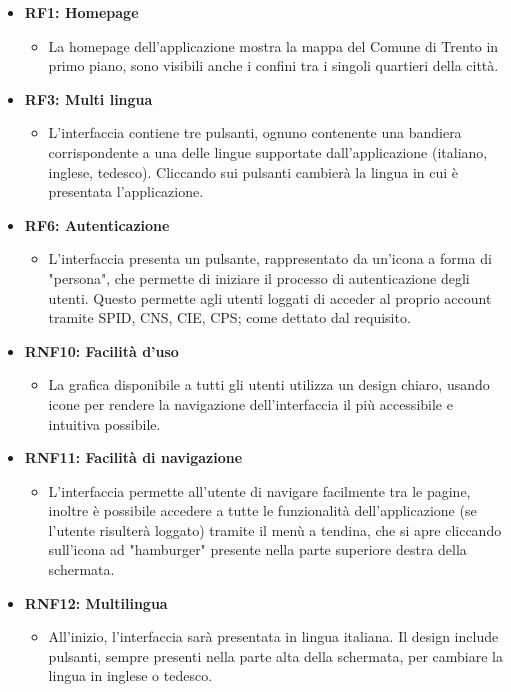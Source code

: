     \begin{itemize}
        \item \textbf{RF1: Homepage} \begin{itemize}
            \item La homepage dell'applicazione mostra la mappa del Comune di Trento in primo piano, sono visibili anche i confini tra i singoli quartieri della città.
        \end{itemize}
        \item \textbf{RF3: Multi lingua} \begin{itemize} 
                \item L'interfaccia contiene tre pulsanti, ognuno contenente una bandiera corrispondente a una delle lingue supportate dall'applicazione (italiano, inglese, tedesco). Cliccando sui pulsanti cambierà la lingua in cui è presentata l'applicazione.
        \end{itemize}
        \item \textbf{RF6: Autenticazione} \begin{itemize} 
            \item L'interfaccia presenta un pulsante, rappresentato da un'icona a forma di "persona", che permette di iniziare il processo di autenticazione degli utenti. Questo permette agli utenti loggati di acceder al proprio account tramite SPID, CNS, CIE, CPS; come dettato dal requisito.
        \end{itemize}
        \item \textbf{RNF10: Facilità d’uso} \begin{itemize}
                \item La grafica disponibile a tutti gli utenti utilizza un design chiaro, usando icone per rendere la navigazione dell'interfaccia il più accessibile e intuitiva possibile. 
        \end{itemize}
        \item \textbf{RNF11: Facilità di navigazione} \begin{itemize}
            \item L'interfaccia permette all'utente di navigare facilmente tra le pagine, inoltre è possibile accedere a tutte le funzionalità dell'applicazione (se l'utente risulterà loggato) tramite il menù a tendina, che si apre cliccando sull'icona ad "hamburger" presente nella parte superiore destra della schermata.
        \end{itemize}
        \item \textbf{RNF12: Multilingua} \begin{itemize} 
            \item All'inizio, l'interfaccia sarà presentata in lingua italiana. Il design include pulsanti, sempre presenti nella parte alta della schermata, per cambiare la lingua in inglese o tedesco.
        \end{itemize}
    \end{itemize}


